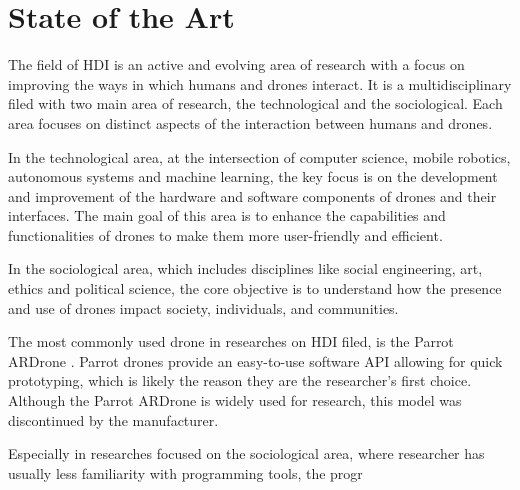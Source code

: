 \section{State of the Art}\label{sec:intro_soa}
The field of HDI is an active and evolving area of research with a focus on improving the ways in which humans
and drones interact. It is a multidisciplinary filed with two main area of research, the technological and the sociological.
Each area focuses on distinct aspects of the interaction between humans and drones.

In the technological area, at the intersection of computer science, mobile robotics, autonomous systems and machine learning,
the key focus is on the development and improvement of the hardware and software components of drones and their interfaces.
The main goal of this area is to enhance the capabilities and functionalities of drones to make them more user-friendly and efficient.

In the sociological area, which includes disciplines like social engineering, art, ethics and political science,
the core objective is to understand how the presence and use of drones impact society, individuals, and communities.

The most commonly used drone in researches on HDI filed, is the Parrot ARDrone \cite{tezza2019hdi}. 
Parrot drones provide an easy-to-use software API allowing for quick prototyping, which is likely the reason they are the
researcher's first choice. Although the Parrot ARDrone is widely used for research,
this model was discontinued by the manufacturer.

Especially in researches focused on the sociological area, where researcher has usually less familiarity with programming tools, 
the progr


